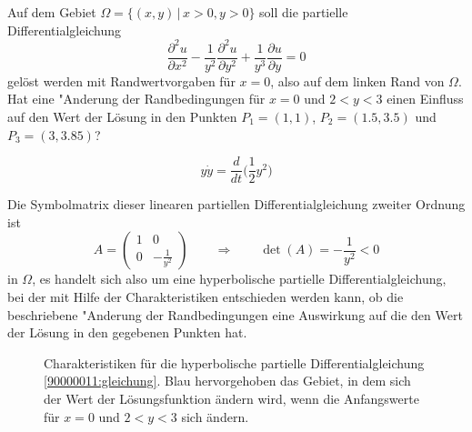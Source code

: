 Auf dem Gebiet $\Omega=\{(x,y)\,|\, x>0, y>0\}$ soll die partielle
Differentialgleichung
\begin{equation}
\frac{\partial^2 u}{\partial x^2}-\frac1{y^2}\frac{\partial^2 u}{\partial y^2} 
+
\frac1{y^3}\frac{\partial u}{\partial y}=0
\label{90000011:gleichung}
\end{equation}
gelöst werden mit Randwertvorgaben für $x=0$, also auf dem linken Rand von
$\Omega$.
Hat eine "Anderung der Randbedingungen für $x=0$ und $2 < y<3$ einen
Einfluss auf den Wert der Lösung in den Punkten
$P_1=(1,1)$,
$P_2=(1.5,3.5)$ und
$P_3=(3,3.85)$?

\begin{hinweis}
\[
y\dot y=\frac{d}{dt}\bigl(
{\textstyle \frac12}y^2
\bigr)
\]
\end{hinweis}

\begin{loesung}
Die Symbolmatrix dieser linearen partiellen Differentialgleichung zweiter
Ordnung ist
\[
A=\begin{pmatrix}
1&0\\
0&-\frac1{y^2}
\end{pmatrix}
\qquad
\Rightarrow
\qquad
\det(A)=-\frac1{y^2}<0
\]
in $\Omega$, es handelt sich also um eine hyperbolische partielle
Differentialgleichung, bei der mit Hilfe der Charakteristiken entschieden
werden kann, ob die beschriebene "Anderung der Randbedingungen eine 
Auswirkung auf die den Wert der Lösung in den gegebenen Punkten hat.
\begin{figure}
\begin{center}
\end{center}
\caption{Charakteristiken für die hyperbolische partielle
Differentialgleichung \eqref{90000011:gleichung}.
Blau hervorgehoben das Gebiet, in dem sich der Wert der Lösungsfunktion
ändern wird, wenn die Anfangswerte für $x=0$ und $2<y<3$ sich ändern.
\label{90000011:bild}}
\end{figure}


\end{loesung}
